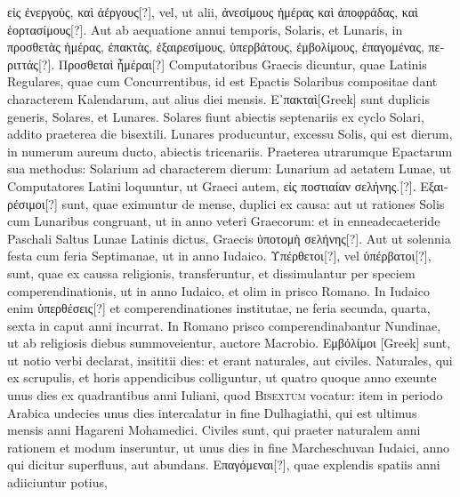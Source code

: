  \textgreek{εἰς ἐνεργοὺς, καὶ ἀέργους[?]}, vel, ut alii,
\textgreek{ἀνεσίμους ἡμέρας καὶ ἀποφράδας, καὶ ἑορτασίμους[?]}.
Aut ab aequatione annui
temporis, Solaris, et Lunaris, in
 \textgreek{προσθετὰς ἡμέρας, ἐπακτὰς, ἐξαιρεσίμους,
ὑπερβάτους, ἐμβολίμους, ἐπαγομένας, περιττάς[?]}.
\textgreek{Προσθεταὶ ἧμέραι[?]} Computatoribus
Graecis dicuntur, quae Latinis Regulares, quae cum Concurrentibus,
id est Epactis Solaribus compositae dant characterem Kalendarum,
aut alius diei mensis.
\textgreek{Ε᾽πακταὶ[Greek]} sunt duplicis generis, Solares, et
Lunares.
Solares fiunt abiectis septenariis ex cyclo Solari, addito praeterea
die bisextili.
Lunares producuntur, excessu Solis, qui est  dierum,
in numerum aureum ducto, abiectis tricenariis.
Praeterea utrarumque
Epactarum sua methodus: Solarium ad characterem dierum:
Lunarium ad aetatem Lunae, ut Computatores Latini loquuntur, ut
Graeci autem, \textgreek{εἰς ποστιαίαν σελήνης.[?]}.
%
\textgreek{Εξαιρέσιμοι[?]} sunt, quae eximuntur de
mense, duplici ex causa: aut ut rationes Solis cum Lunaribus congruant,
ut in anno veteri Graecorum: et in enneadecaeteride Paschali
Saltus Lunae Latinis dictus, Graecis \textgreek{ὑποτομὴ σελήνης[?]}.
Aut ut solennia
festa cum feria Septimanae, ut in anno Iudaico.
\textgreek{Υπέρθετοι[?]}, vel \textgreek{ὑπέρβατοι[?]},
sunt, quae ex caussa religionis, transferuntur, et dissimulantur per speciem
comperendinationis, ut in anno Iudaico, et olim in prisco Romano.
In Iudaico enim \textgreek{ὑπερθέσεις[?]} et comperendinationes
 institutae, ne
feria secunda, quarta, sexta in caput anni incurrat.
In Romano prisco
comperendinabantur Nundinae, ut ab religiosis diebus summoveientur,
auctore Macrobio.
\textgreek{Εμβόλίμοι [Greek]} sunt, ut notio verbi declarat, insititii
dies: et erant naturales, aut civiles.
Naturales, qui ex scrupulis, et
horis appendicibus colliguntur, ut quatro quoque anno exeunte unus
dies ex quadrantibus anni Iuliani, quod \textsc{Bisextum} vocatur: item
in periodo Arabica undecies unus dies intercalatur in fine Dulhagiathi,
qui est ultimus mensis anni Hagareni Mohamedici.
Civiles sunt,
qui praeter naturalem anni rationem et modum inseruntur, ut unus
dies in fine Marcheschuvan Iudaici, anno qui dicitur superfluus, aut
abundans.
\textgreek{Επαγόμεναι[?]},
 quae explendis spatiis anni adiiciuntur potius,
